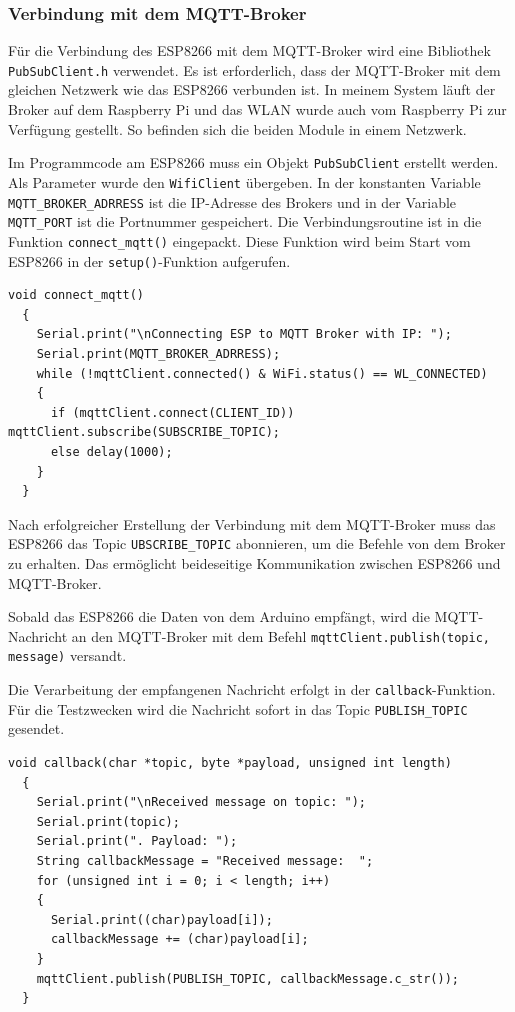 \documentclass[12pt, letterpaper]{article}
\begin{document}
\subsubsection{Verbindung mit dem MQTT-Broker}
\par Für die Verbindung des ESP8266 mit dem MQTT-Broker wird eine Bibliothek \texttt{PubSubClient.h} verwendet. Es ist erforderlich, dass der MQTT-Broker mit dem gleichen Netzwerk wie das ESP8266 verbunden ist. In meinem System läuft der Broker auf dem Raspberry Pi und das WLAN wurde auch vom Raspberry Pi zur Verfügung gestellt. So befinden sich die beiden Module in einem Netzwerk. 
\par Im Programmcode am ESP8266 muss ein Objekt \texttt{PubSubClient} erstellt werden. Als Parameter wurde den \texttt{WifiClient} übergeben. In der konstanten Variable \texttt{MQTT\_BROKER\_ADRRESS} ist die IP-Adresse des Brokers und in der Variable \texttt{MQTT\_PORT} ist die Portnummer gespeichert. Die Verbindungsroutine ist in die Funktion \texttt{connect\_mqtt()} eingepackt. Diese Funktion wird beim Start vom ESP8266 in der \texttt{setup()}-Funktion aufgerufen.
\begin{Verbatim}[frame=single]
  void connect_mqtt()
  {
    Serial.print("\nConnecting ESP to MQTT Broker with IP: ");
    Serial.print(MQTT_BROKER_ADRRESS);
    while (!mqttClient.connected() & WiFi.status() == WL_CONNECTED)
    {
      if (mqttClient.connect(CLIENT_ID)) mqttClient.subscribe(SUBSCRIBE_TOPIC);
      else delay(1000);
    }
  }
\end{Verbatim}
\par Nach erfolgreicher Erstellung der Verbindung mit dem MQTT-Broker muss das ESP8266 das Topic \texttt{UBSCRIBE\_TOPIC} abonnieren, um die Befehle von dem Broker zu erhalten. Das ermöglicht beideseitige Kommunikation zwischen ESP8266 und MQTT-Broker.
\par Sobald das ESP8266 die Daten von dem Arduino empfängt, wird die MQTT-Nachricht an den MQTT-Broker mit dem Befehl \texttt{mqttClient.publish(topic, message)} versandt.
\par Die Verarbeitung der empfangenen Nachricht erfolgt in der \texttt{callback}-Funktion. Für die Testzwecken wird die Nachricht sofort in das Topic \texttt{PUBLISH\_TOPIC} gesendet.

\begin{Verbatim}[frame=single]
  void callback(char *topic, byte *payload, unsigned int length)
  {
    Serial.print("\nReceived message on topic: ");
    Serial.print(topic);
    Serial.print(". Payload: ");
    String callbackMessage = "Received message:  ";
    for (unsigned int i = 0; i < length; i++)
    {
      Serial.print((char)payload[i]);
      callbackMessage += (char)payload[i];
    }
    mqttClient.publish(PUBLISH_TOPIC, callbackMessage.c_str());
  }
\end{Verbatim}
\newpage
\listoffigures
\end{document}
